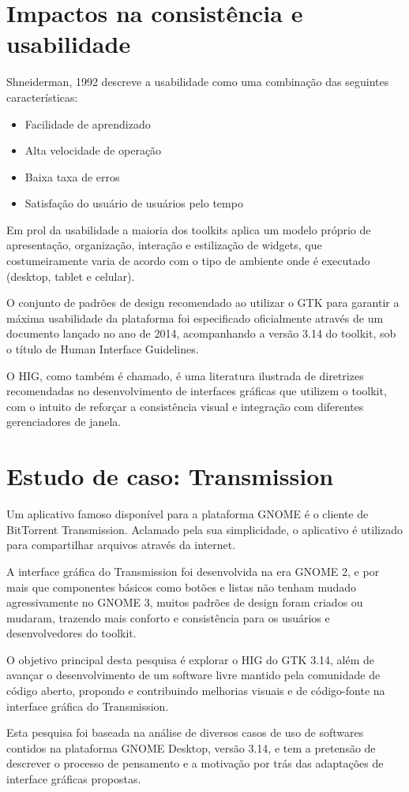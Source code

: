 \section{Impactos na consistência e usabilidade}

Shneiderman, 1992 descreve a usabilidade como uma combinação das seguintes
características:

\begin{itemize}
    \item Facilidade de aprendizado
    \item Alta velocidade de operação
    \item Baixa taxa de erros
    \item Satisfação do usuário
     de usuários pelo tempo
\end{itemize}

Em prol da usabilidade a maioria dos toolkits aplica um modelo próprio de
apresentação, organização, interação e estilização de widgets, que
costumeiramente varia de acordo com o tipo de ambiente onde é executado
(desktop, tablet e celular).

O conjunto de padrões de design recomendado ao utilizar o GTK para garantir a
máxima usabilidade da plataforma foi especificado oficialmente através de um
documento lançado no ano de 2014, acompanhando a versão 3.14 do toolkit, sob o
título de Human Interface Guidelines.

O HIG, como também é chamado, é uma literatura ilustrada de diretrizes
recomendadas no desenvolvimento de interfaces gráficas que utilizem o toolkit,
com o intuito de reforçar a consistência visual e integração com diferentes
gerenciadores de janela.

\section{Estudo de caso: Transmission}

Um aplicativo famoso disponível para a plataforma GNOME é o cliente de
BitTorrent Transmission. Aclamado pela sua simplicidade, o aplicativo é
utilizado para compartilhar arquivos através da internet.

A interface gráfica do Transmission foi desenvolvida na era GNOME 2, e por mais
que componentes básicos como botões e listas não tenham mudado agressivamente no
GNOME 3, muitos padrões de design foram criados ou mudaram, trazendo mais
conforto e consistência para os usuários e desenvolvedores do toolkit.

O objetivo principal desta pesquisa é explorar o HIG do GTK 3.14, além de
avançar o desenvolvimento de um software livre mantido pela comunidade de código
aberto, propondo e contribuindo melhorias visuais e de código-fonte na interface
gráfica do Transmission.

Esta pesquisa foi baseada na análise de diversos casos de uso de softwares
contidos na plataforma GNOME Desktop, versão 3.14, e tem a pretensão de
descrever o processo de pensamento e a motivação por trás das adaptações de
interface gráficas propostas.
